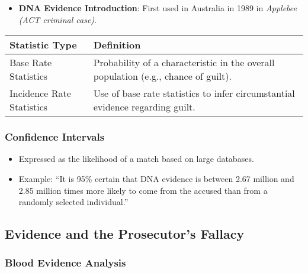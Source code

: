\begin{itemize}
\tightlist
\item
  \textbf{DNA Evidence Introduction}: First used in Australia in 1989 in
  \emph{Applebee (ACT criminal case)}.
\end{itemize}

\begin{longtable}[]{@{}
  >{\raggedright\arraybackslash}p{}
  >{\raggedright\arraybackslash}p{}@{}}
\toprule\noalign{}
\begin{minipage}[b]{\linewidth}\raggedright
Statistic Type
\end{minipage} & \begin{minipage}[b]{\linewidth}\raggedright
Definition
\end{minipage} \\
\midrule\noalign{}
\endhead
\bottomrule\noalign{}
\endlastfoot
Base Rate Statistics & Probability of a characteristic in the overall
population (e.g., chance of guilt). \\
Incidence Rate Statistics & Use of base rate statistics to infer
circumstantial evidence regarding guilt. \\
\end{longtable}

\subsubsection{Confidence Intervals}\label{confidence-intervals}

\begin{itemize}
\tightlist
\item
  Expressed as the likelihood of a match based on large databases.
\item
  Example: ``It is 95\% certain that DNA evidence is between 2.67
  million and 2.85 million times more likely to come from the accused
  than from a randomly selected individual.''
\end{itemize}

\subsection{ Evidence and the Prosecutor's
Fallacy}\label{evidence-and-the-prosecutors-fallacy}

\subsubsection{Blood Evidence Analysis}\label{blood-evidence-analysis}

